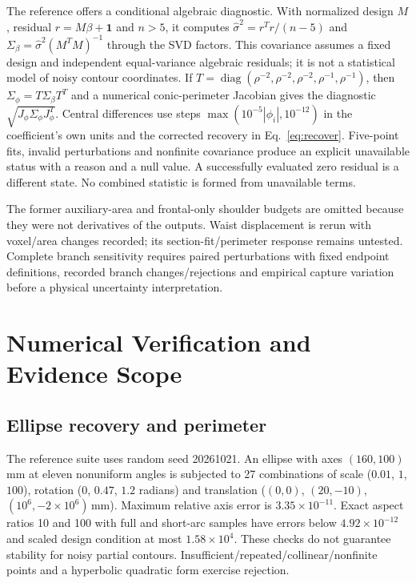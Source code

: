 \documentclass[11pt,a4paper]{article}
\begin{document}
The reference offers a conditional algebraic diagnostic. With normalized design $M$, residual $r=M\beta+\mathbf1$ and $n>5$, it computes $\hat\sigma^2=r^Tr/(n-5)$ and $\Sigma_\beta=\hat\sigma^2(M^TM)^{-1}$ through the SVD factors. This covariance assumes a fixed design and independent equal-variance algebraic residuals; it is not a statistical model of noisy contour coordinates. If $T=\operatorname{diag}(\rho^{-2},\rho^{-2},\rho^{-2},\rho^{-1},\rho^{-1})$, then $\Sigma_\phi=T\Sigma_\beta T^T$ and a numerical conic-perimeter Jacobian gives the diagnostic $\sqrt{J_\phi\Sigma_\phi J_\phi^T}$. Central differences use steps $\max(10^{-5}|\phi_i|,10^{-12})$ in the coefficient's own units and the corrected recovery in Eq.~\eqref{eq:recover}. Five-point fits, invalid perturbations and nonfinite covariance produce an explicit unavailable status with a reason and a null value. A successfully evaluated zero residual is a different state. No combined statistic is formed from unavailable terms.

The former auxiliary-area and frontal-only shoulder budgets are omitted because they were not derivatives of the outputs. Waist displacement is rerun with voxel/area changes recorded; its section-fit/perimeter response remains untested. Complete branch sensitivity requires paired perturbations with fixed endpoint definitions, recorded branch changes/rejections and empirical capture variation before a physical uncertainty interpretation.

\section{Numerical Verification and Evidence Scope}
\subsection{Ellipse recovery and perimeter}
The reference suite uses random seed 20261021. An ellipse with axes $(160,100)$\,mm at eleven nonuniform angles is subjected to 27 combinations of scale ($0.01$, $1$, $100$), rotation ($0$, $0.47$, $1.2$ radians) and translation ($(0,0)$, $(20,-10)$, $(10^6,-2\times10^6)$\,mm). Maximum relative axis error is $3.35\times10^{-11}$. Exact aspect ratios 10 and 100 with full and short-arc samples have errors below $4.92\times10^{-12}$ and scaled design condition at most $1.58\times10^4$. These checks do not guarantee stability for noisy partial contours. Insufficient/repeated/collinear/nonfinite points and a hyperbolic quadratic form exercise rejection.
\end{document}
